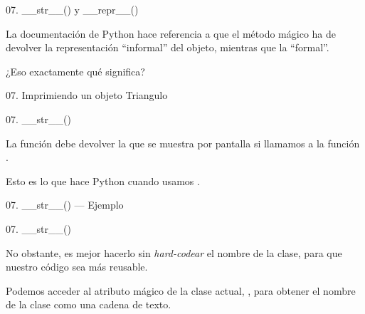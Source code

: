 
\begin{frame}{07. \_\_str\_\_() y \_\_repr\_\_()}
  \begin{center}
    \small
    La documentación de Python hace referencia a que el método mágico
     ha de devolver la representación
    ``informal'' del objeto, mientras que 
    la ``formal''.
  \end{center}

  \begin{block}{}
    \centering
    \Large
    ¿Eso exactamente qué significa?
  \end{block}
\end{frame}

\begin{frame}{07. Imprimiendo un objeto Triangulo}
  \footnotesize
\end{frame}

\begin{frame}{07. \_\_str\_\_()}
  \begin{block}{}
    \centering
    La función  debe devolver la
     que se muestra por pantalla si
    llamamos a la función .
  \end{block}

  \begin{center}
    \small
    Esto es lo que hace Python cuando usamos .
  \end{center}
\end{frame}

\begin{frame}{07. \_\_str\_\_() — Ejemplo}
  \scriptsize
\end{frame}

\begin{frame}{07. \_\_str\_\_()}
  \begin{block}{}
    \centering
    No obstante, es mejor hacerlo sin \textit{hard-codear} el nombre
    de la clase, para que nuestro código sea más reusable.
  \end{block}

  \begin{center}
    Podemos acceder al atributo mágico  de la
    clase actual, , para obtener el nombre de la
    clase como una cadena de texto.
  \end{center}
\end{frame}

